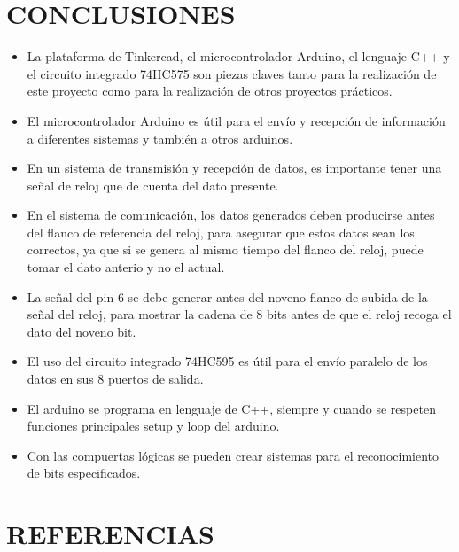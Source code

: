 \documentclass{article}
\begin{document}
\section{CONCLUSIONES} \label{conclulsion}
\begin{itemize}
\item La plataforma de Tinkercad, el microcontrolador Arduino, el lenguaje C++ y el circuito integrado 74HC575 son piezas claves tanto para la realización de este proyecto como para la realización de otros proyectos prácticos.

\item El microcontrolador Arduino es útil para el envío y recepción de información a diferentes sistemas y también a otros arduinos.

\item En un sistema de transmisión y recepción de datos, es importante tener una señal de reloj que de cuenta del dato presente.

\item En el sistema de comunicación, los datos generados deben producirse antes del flanco de referencia del reloj, para asegurar que estos datos sean los correctos, ya que si se genera al mismo tiempo del flanco del reloj, puede tomar el dato anterio y no el actual.

\item La señal del pin 6 se debe generar antes del noveno flanco de subida de la señal del reloj, para mostrar la cadena de 8 bits antes de que el reloj recoga el dato del noveno bit.

\item El uso del circuito integrado 74HC595 es útil para el envío paralelo de los datos en sus 8 puertos de salida.

\item El arduino se programa en lenguaje de C++, siempre y cuando se respeten funciones principales setup y loop del arduino.

\item Con las compuertas lógicas se pueden crear sistemas para el reconocimiento de bits especificados.



\end{itemize}

\section{REFERENCIAS}    




\end{document}
